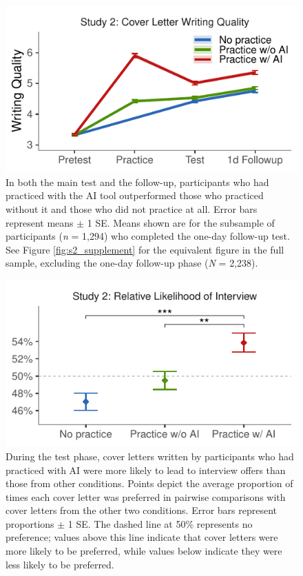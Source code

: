 \documentclass[11pt]{report}
\begin{document}
\begin{mainf}
\begin{figure}[t]
    \centering
    \includegraphics[width=1\linewidth]{mainfig.pdf}
    \caption{In both the main test and the follow-up, participants who had practiced with the AI tool outperformed those who practiced without it and those who did not practice at all.
    Error bars represent means $\pm$ 1 SE.
    Means shown are for the subsample of participants (\textit{n} = 1,294) who completed the one-day follow-up test. See Figure \ref{fig:s2_supplement} for the equivalent figure in the full sample, excluding the one-day follow-up phase (\textit{N} = 2,238).}
    \label{fig:difs}
\end{figure}

\begin{figure}[]
    \centering
    \includegraphics[width=1\linewidth]{ratings1.pdf}
    \caption{During the test phase, cover letters written by participants who had practiced with AI were more likely to lead to interview offers than those from other conditions. Points depict the average proportion of times each cover letter was preferred in pairwise comparisons with cover letters from the other two conditions. Error bars represent proportions $\pm$ 1 SE. The dashed line at 50\% represents no preference; values above this line indicate that cover letters were more likely to be preferred, while values below indicate they were less likely to be preferred.}
    \label{fig:ratings1}
\end{figure}


\end{mainf}
\end{document}
